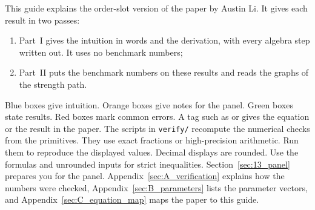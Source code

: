 \begin{minipage}{0.84\linewidth}
\raggedright\small
This guide explains the order-slot version of the paper by Austin Li. It gives each result in two passes:
\begin{enumerate}[nosep,leftmargin=1.6em]
\item Part~I gives the intuition in words and the derivation, with every algebra step written out. It uses
no benchmark numbers;
\item Part~II puts the benchmark numbers on these results and reads the graphs of the strength path.
\end{enumerate}
\smallskip
Blue boxes give intuition. Orange boxes give notes for the panel. Green boxes state results. Red boxes
mark common errors. A tag such as  or  gives the equation or the result in the
paper. The scripts in \texttt{verify/} recompute the numerical checks from the primitives. They use exact fractions or high-precision arithmetic.
Run them to reproduce the displayed values.
Decimal displays are rounded. Use the formulas and unrounded inputs for strict inequalities.
Section~\ref{sec:13_panel} prepares you for the panel. Appendix~\ref{sec:A_verification} explains how the numbers
were checked, Appendix~\ref{sec:B_parameters} lists the parameter vectors, and Appendix~\ref{sec:C_equation_map}
maps the paper to this guide.
\end{minipage}
